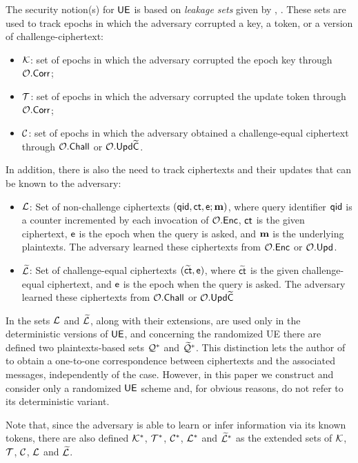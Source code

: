 \documentclass{fundam}
\begin{document}
The security notion(s) for $\mathsf{UE}$ is based on \textit{leakage sets} given by \cite{klooss2019r}, \cite{jiang2020}. These sets are used to track epochs in which the adversary corrupted a key, a token, or a version of challenge-ciphertext:
\begin{itemize}
\item $\mathcal{K}$: set of epochs in which the adversary corrupted the epoch key through $\mathcal{O}.\mathsf{Corr}$; 
\item $\mathcal{T}$: set of epochs in which the adversary corrupted the update token through $\mathcal{O}.\mathsf{Corr}$; 
\item $\mathcal{C}$: set of epochs in which the adversary obtained a challenge-equal ciphertext through $\mathcal{O}.\mathsf{Chall}$ or $\mathcal{O}.\mathsf{Upd}\widetilde{\mathsf{C}}$.
\end{itemize}
%
In addition, there is also the need to track ciphertexts and their updates that can be known to the adversary:
\begin{itemize}
\item $\mathcal{L}$: Set of non-challenge ciphertexts $(\mathsf{qid}, \mathsf{ct}, \mathsf{e} ; \mathbf{m})$, where query identifier $\mathsf{qid}$ is a counter incremented by each invocation of $\mathcal{O}.\mathsf{Enc}$, $\mathsf{ct}$ is the given ciphertext, $\mathsf{e}$ is the epoch when the query is asked, and $\mathbf{m}$ is the underlying plaintexts. The adversary learned these ciphertexts from $\mathcal{O}.\mathsf{Enc}$ or $\mathcal{O}.\mathsf{Upd}$.
\item $\widetilde{\mathcal{L}}$: Set of challenge-equal ciphertexts $(\widetilde{\mathsf{ct}}, \mathsf{e})$, where $\widetilde{\mathsf{ct}}$ is the given challenge-equal ciphertext, and $\mathsf{e}$ is the epoch when the query is asked. The adversary learned these ciphertexts from $\mathcal{O}.\mathsf{Chall}$ or $\mathcal{O}.\mathsf{Upd}\widetilde{\mathsf{C}}$
\end{itemize} 
%
In \cite{jiang2020} the sets $\mathcal{L}$ and $\widetilde{\mathcal{L}}$, along with their extensions, are used only in the deterministic versions of $\mathsf{UE}$, and concerning the randomized UE there are defined two plaintexts-based sets $\mathcal{Q}^{*}$ and $\widetilde{\mathcal{Q}}^{*}$. 
This distinction lets the author of \cite{jiang2020} to obtain a one-to-one correspondence between ciphertexts and the associated messages, independently of the case. 
However, in this paper we construct and consider only a randomized $\mathsf{UE}$ scheme and, for obvious reasons, do not refer to its deterministic variant.  


Note that, since the adversary is able to learn or infer information via its known tokens, there are also defined $\mathcal{K}^{*}$, $\mathcal{T}^{*}$, $\mathcal{C}^{*}$, $\mathcal{L}^{*}$ and $\widetilde{\mathcal{L}}^{*}$ as the extended sets of $\mathcal{K}$, $\mathcal{T}$, $\mathcal{C}$, $\mathcal{L}$ and $\widetilde{\mathcal{L}}$.
\end{document}
